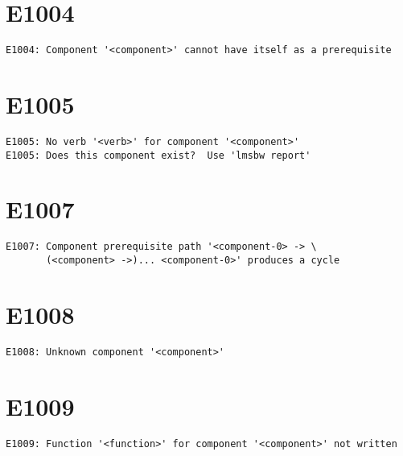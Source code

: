 \section{E1004}

\begin{verbatim}
E1004: Component '<component>' cannot have itself as a prerequisite
\end{verbatim}

\section{E1005}

\begin{verbatim}
E1005: No verb '<verb>' for component '<component>'
E1005: Does this component exist?  Use 'lmsbw report'
\end{verbatim}


\section{E1007}

\begin{verbatim}
E1007: Component prerequisite path '<component-0> -> \
       (<component> ->)... <component-0>' produces a cycle
\end{verbatim}

\section{E1008}

\begin{verbatim}
E1008: Unknown component '<component>'
\end{verbatim}

\section{E1009}

\begin{verbatim}
E1009: Function '<function>' for component '<component>' not written
\end{verbatim}


